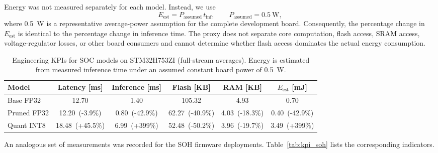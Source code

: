 \documentclass[review]{elsarticle}
\begin{document}
Energy was not measured separately for each model. Instead, we use
\begin{equation}
    E_{\mathrm{est}}=P_{\mathrm{assumed}}\,t_{\mathrm{inf}},\qquad P_{\mathrm{assumed}}=\SI{0.5}{\watt},
\end{equation}
where \SI{0.5}{\watt} is a representative average-power assumption for the complete development board. Consequently, the percentage change in $E_{\mathrm{est}}$ is identical to the percentage change in inference time. The proxy does not separate core computation, flash access, SRAM access, voltage-regulator losses, or other board consumers and cannot determine whether flash access dominates the actual energy consumption.
\begin{table}[t!]
      \centering
      \caption{Engineering KPIs for SOC models on STM32H753ZI (full-stream averages). Energy is estimated from measured inference time under an assumed constant board power of \SI{0.5}{\watt}.}
      \label{tab:kpi}
        \begin{tabular}{lccccc}
            \toprule
            Model & Latency [ms] & Inference [ms] & Flash [KB] & RAM [KB] & $E_{\mathrm{est}}$ [mJ] \\
            \midrule
            Base FP32 & 12.70 & 1.40 & 105.32 & 4.93 & 0.70 \\
            Pruned FP32 & 12.20~\textcolor{mgGreen}{(-3.9\%)} & 0.80~\textcolor{mgGreen}{(-42.9\%)} & 62.27~\textcolor{mgGreen}{(-40.9\%)} & 4.03~\textcolor{mgGreen}{(-18.3\%)} & 0.40~\textcolor{mgGreen}{(-42.9\%)} \\
            Quant INT8 & 18.48~\textcolor{mgRed}{(+45.5\%)} & 6.99~\textcolor{mgRed}{(+399\%)} & 52.48~\textcolor{mgGreen}{(-50.2\%)} & 3.96~\textcolor{mgGreen}{(-19.7\%)} & 3.49~\textcolor{mgRed}{(+399\%)} \\
            \bottomrule
        \end{tabular}
  \end{table}
An analogous set of measurements was recorded for the SOH firmware deployments. Table~\ref{tab:kpi_soh} lists the corresponding indicators.
\end{document}

